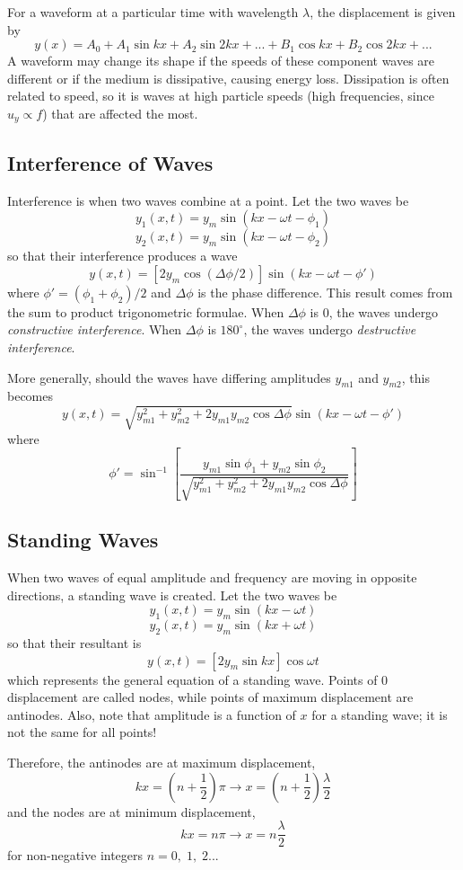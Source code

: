 \documentclass[../PhysicsFormulae.tex]{subfiles}
\begin{document}
For a waveform at a particular time with wavelength $\lambda$, the displacement is given by 
\[ y(x) = A_0 + A_1\sin{kx} + A_2\sin{2kx} + ... + B_1\cos{kx} + B_2\cos{2kx} + ... \]
A waveform may change its shape if the speeds of these component waves are different or if the medium is dissipative, causing energy loss. Dissipation is often related to speed, so it is waves at high particle speeds (high frequencies, since $u_y \propto f$) that are affected the most. 

\subsection{Interference of Waves}
Interference is when two waves combine at a point. Let the two waves be 
\[ y_1(x,t) = y_m \sin(kx - \omega t - \phi_1) \]
\[ y_2(x,t) = y_m \sin(kx - \omega t - \phi_2) \]
so that their interference produces a wave 
\[ y(x,t) = [2y_m\cos(\Delta \phi /2 )] \sin(kx - \omega t - \phi') \]
where $\phi' = (\phi_1+\phi_2)/2$ and $\Delta \phi$ is the phase difference. This result comes from the sum to product trigonometric formulae. When $\Delta \phi$ is 0, the waves undergo \textit{constructive interference}. When $\Delta \phi$ is $180^{\circ}$, the waves undergo \textit{destructive interference}. \bigskip

More generally, should the waves have differing amplitudes $y_{m1}$ and $y_{m2}$, this becomes 
\[ y(x,t) = \sqrt{y_{m1}^2 + y_{m2}^2 + 2y_{m1}y_{m2}\cos{\Delta \phi}} \sin(kx - \omega t - \phi') \]
where
\[ \phi' = \sin^{-1}\left[ \frac{y_{m1}\sin{\phi_1} + y_{m2}\sin{\phi_2}}{\sqrt{y_{m1}^2 + y_{m2}^2 + 2y_{m1}y_{m2}\cos{\Delta \phi}}} \right] \]

\subsection{Standing Waves}
When two waves of equal amplitude and frequency are moving in opposite directions, a standing wave is created. Let the two waves be 
\[ y_1(x,t) = y_m\sin(kx - \omega t) \]
\[ y_2(x,t) = y_m\sin(kx + \omega t) \]
so that their resultant is 
\[ y(x,t) = [2y_m \sin{kx}] \cos{\omega t} \]
which represents the general equation of a standing wave. Points of 0 displacement are called nodes, while points of maximum displacement are antinodes. Also, note that amplitude is a function of $x$ for a standing wave; it is not the same for all points!\bigskip

Therefore, the antinodes are at maximum displacement, 
\[ kx = \left(n+\frac{1}{2}\right)\pi \rightarrow x = \left(n+\frac{1}{2}\right) \frac{\lambda}{2} \]
and the nodes are at minimum displacement, 
\[ kx = n\pi \rightarrow x = n\frac{\lambda}{2} \]
for non-negative integers $n=0, \; 1, \; 2...$\bigskip
\end{document}
